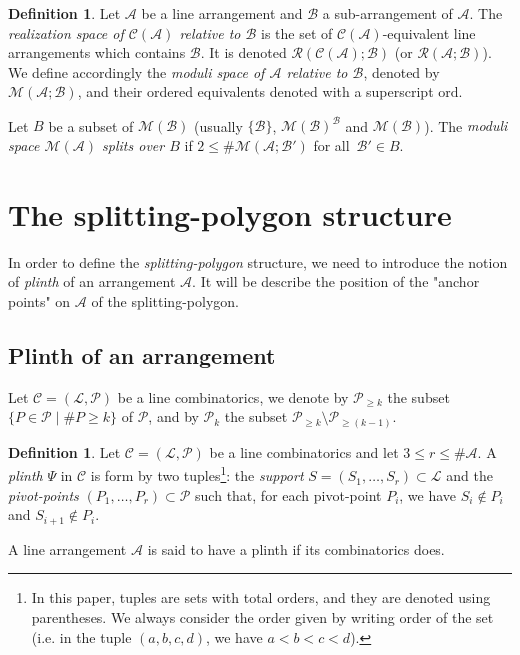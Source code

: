 \documentclass[11pt, a4paper]{amsart}
\theoremstyle{definition}
\newtheorem{definition}[theorem]{Definition}
\theoremstyle{remark}
\newcommand{\A}{\mathcal{A}}
\newcommand{\B}{\mathcal{B}}
\newcommand{\R}{\mathcal{R}}
\newcommand{\C}{\mathcal{C}}
\newcommand{\M}{\mathcal{M}}
\renewcommand{\P}{\mathcal{P}}
\renewcommand{\L}{\mathcal{L}}
\newcommand{\ord}{\text{ord}}
\begin{document}
\begin{definition}
	Let $\A$ be a line arrangement and $\B$ a sub-arrangement of $\A$. The \emph{realization space of $\C(\A)$ relative to $\B$} is the set of $\C(\A)$-equivalent line arrangements which contains $\B$. It is denoted $\R(\C(\A);\B)$ (or $\R(\A;\B)$). We define accordingly the \emph{moduli space of  $\A$ relative to $\B$}, denoted by~$\M(\A;\B)$, and their ordered equivalents denoted with a superscript $\ord$.
	
	Let $B$ be a subset of $\M(\B)$ (usually $\{\B\}$, $\M(\B)^\B$ and $\M(\B)$). The \emph{moduli space $\M(\A)$ splits over $B$} if $ 2 \leq \# \M(\A;\B')$ for all~$\B'\in B$.
\end{definition}


\section{The splitting-polygon structure}\label{sec:SPS}\mbox{}

In order to define the \emph{splitting-polygon} structure, we need to introduce the notion of \emph{plinth} of an arrangement $\A$. It will be describe the position of the "anchor points" on $\A$ of the splitting-polygon.


\subsection{Plinth of an arrangement}\mbox{}


Let $\C=(\L,\P)$ be a line combinatorics, we denote by $\P_{\geq k}$ the subset $\{P\in\P \mid \# P \geq k \}$ of $\P$, and by $\P_k$ the subset $\P_{\geq k}\setminus \P_{\geq (k-1)}$. 

\begin{definition}
	Let $\C=(\L,\P)$ be a line combinatorics and let $3 \leq r \leq \# \A$. A \emph{plinth} $\Psi$ in $\C$ is form by two tuples\footnote{In this paper, tuples are sets with total orders, and they are denoted using parentheses. We always consider the order given by writing order of the set (i.e. in the tuple $(a,b,c,d)$, we have $a<b<c<d$).}: the \emph{support} $S=(S_1,\dots,S_r) \subset \L$ and the \emph{pivot-points} $(P_1,\dots,P_r)\subset\P$ such that, for each pivot-point $P_i$, we have $S_i\notin P_i$ and $S_{i+1}\notin P_i$.
	
A line arrangement $\A$ is said to have a plinth if its combinatorics does. 
\end{definition}
\end{document}
